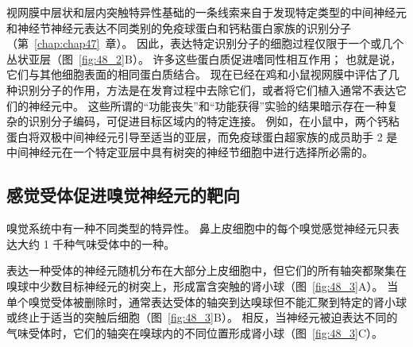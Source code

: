 视网膜中层状和层内突触特异性基础的一条线索来自于发现特定类型的中间神经元和神经节神经元表达不同类别的免疫球蛋白和钙粘蛋白家族的识别分子（第~\ref{chap:chap47}~章）。
因此，表达特定识别分子的细胞过程仅限于一个或几个丛状亚层（图~\ref{fig:48_2}B）。
许多这些蛋白质促进嗜同性相互作用；
也就是说，它们与其他细胞表面的相同蛋白质结合。
现在已经在鸡和小鼠视网膜中评估了几种识别分子的作用，方法是在发育过程中去除它们，或者将它们植入通常不表达它们的神经元中。
这些所谓的“功能丧失”和“功能获得”实验的结果暗示存在一种复杂的识别分子编码，可促进目标区域内的特定连接。
例如，在小鼠中，两个钙粘蛋白将双极中间神经元引导至适当的亚层，而免疫球蛋白超家族的成员助手 2 是中间神经元在一个特定亚层中具有树突的神经节细胞中进行选择所必需的。



\subsection{感觉受体促进嗅觉神经元的靶向}

嗅觉系统中有一种不同类型的特异性。
鼻上皮细胞中的每个嗅觉感觉神经元只表达大约 1 千种气味受体中的一种。


表达一种受体的神经元随机分布在大部分上皮细胞中，但它们的所有轴突都聚集在嗅球中少数目标神经元的树突上，形成富含突触的肾小球（图~\ref{fig:48_3}A）。
当单个嗅觉受体被删除时，通常表达受体的轴突到达嗅球但不能汇聚到特定的肾小球或终止于适当的突触后细胞（图~\ref{fig:48_3}B）。
相反，当神经元被迫表达不同的气味受体时，它们的轴突在嗅球内的不同位置形成肾小球（图~\ref{fig:48_3}C）。


